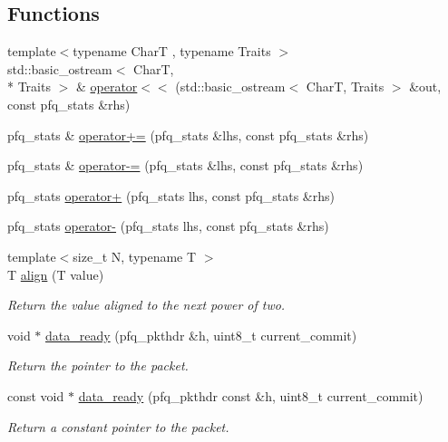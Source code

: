 \subsection*{Functions}
\begin{DoxyCompactItemize}
\item 
{\footnotesize template$<$typename Char\+T , typename Traits $>$ }\\std\+::basic\+\_\+ostream$<$ Char\+T, \\*
Traits $>$ \& \hyperlink{namespacepfq_a1c2bda68e2e2c718ebd80519034002a3}{operator$<$$<$} (std\+::basic\+\_\+ostream$<$ Char\+T, Traits $>$ \&out, const pfq\+\_\+stats \&rhs)
\item 
pfq\+\_\+stats \& \hyperlink{namespacepfq_ae140b453ea425ae677dfbc69a51370f8}{operator+=} (pfq\+\_\+stats \&lhs, const pfq\+\_\+stats \&rhs)
\item 
pfq\+\_\+stats \& \hyperlink{namespacepfq_aa7874ca8c38d2bb9b66a33a6c2bb0fc1}{operator-\/=} (pfq\+\_\+stats \&lhs, const pfq\+\_\+stats \&rhs)
\item 
pfq\+\_\+stats \hyperlink{namespacepfq_a1db1dc5635be457a7ca4cd9148ceae19}{operator+} (pfq\+\_\+stats lhs, const pfq\+\_\+stats \&rhs)
\item 
pfq\+\_\+stats \hyperlink{namespacepfq_ad01713142f8fa670ff8614b9f2bab3b8}{operator-\/} (pfq\+\_\+stats lhs, const pfq\+\_\+stats \&rhs)
\item 
{\footnotesize template$<$size\+\_\+t N, typename T $>$ }\\T \hyperlink{namespacepfq_a9db75e7163c5f764248401d10a2a3f9b}{align} (T value)
\begin{DoxyCompactList}\small\item\em Return the value aligned to the next power of two. \end{DoxyCompactList}\item 
void $\ast$ \hyperlink{namespacepfq_a89313b8c7a729b4e37b751db8ea522f4}{data\+\_\+ready} (pfq\+\_\+pkthdr \&h, uint8\+\_\+t current\+\_\+commit)
\begin{DoxyCompactList}\small\item\em Return the pointer to the packet. \end{DoxyCompactList}\item 
const void $\ast$ \hyperlink{namespacepfq_a50ce09535c2c899fe6b3c069681b4cae}{data\+\_\+ready} (pfq\+\_\+pkthdr const \&h, uint8\+\_\+t current\+\_\+commit)
\begin{DoxyCompactList}\small\item\em Return a constant pointer to the packet. \end{DoxyCompactList}\end{DoxyCompactItemize}



